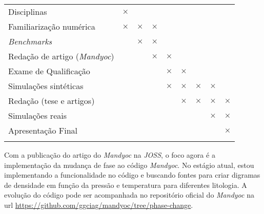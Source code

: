 \begin{center}
\begin{longtable}{lcccccccc}
		Disciplinas & 
            $\times$ & & & & & & & \\ 
		Familiarização numérica & 
			$\times$ & $\times$ & $\times$ & & & & & \\
		\textit{Benchmarks} &
            & $\times$ & $\times$ & & & & & \\
        Redação de artigo (\textit{Mandyoc}) &
            & & $\times$ & $\times$ & & & & \\
        Exame de Qualificação\footnotemark[1] & 
            & & & $\times$ & $\times$ & & & \\
        Simulações sintéticas\footnotemark[2] &
			& & & $\times$ & $\times$ & $\times$ & $\times$ & \\
        Redação (tese e artigos) & 
            & & & & $\times$ &  $\times$ & $\times$ & $\times$ \\
		Simulações reais\footnotemark[3] & 
            & & & & & & $\times$ & $\times$ \\
		Apresentação Final & 
			& & & & & & & $\times$ \\
        
        \label{table:fixed-params}
    \end{longtable}
\end{center}


Com a publicação do artigo do \textit{Mandyoc} na \textit{JOSS}, o foco agora é a implementação da mudança de fase ao código \textit{Mandyoc}. No estágio atual, estou implementando a funcionalidade no código e buscando fontes para criar digramas de densidade em função da pressão e temperatura para diferentes litologia. A evolução do código pode ser acompanhada no repositório oficial do \textit{Mandyoc} na url \url{https://github.com/ggciag/mandyoc/tree/phase-change}.


